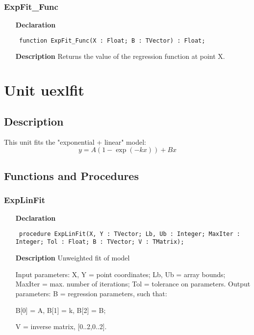 \documentclass[12pt,a4paper,oneside]{report}
\newcommand{\declarationitem}[1]{\textbf{#1}}
\newcommand{\descriptiontitle}[1]{\textbf{#1}}
\newcommand{\code}[1]{\texttt{#1}}
\begin{document}
\subsubsection{ExpFit{\_}Func}
\label{uexpfit-ExpFit_Func}
\begin{itemize}\item[\declarationitem{Declaration}\hfill]
	\begin{flushleft}
		\code{
			function ExpFit{\_}Func(X : Float; B : TVector) : Float;}
		
	\end{flushleft}
	
	\par
	\item[\descriptiontitle{Description}]
	Returns the value of the regression function at point X.
	
\end{itemize}

\section{Unit uexlfit}
\label{uexlfit}
\subsection{Description}
This unit fits the "exponential + linear" model:
$$y = A (1 - \exp(-k x)) + B x$$
\subsection{Functions and Procedures}
\subsubsection{ExpLinFit}
\label{uexlfit-ExpLinFit}
\begin{itemize}\item[\declarationitem{Declaration}\hfill]
	\begin{flushleft}
		\code{
			procedure ExpLinFit(X, Y : TVector; Lb, Ub : Integer; MaxIter : Integer; Tol : Float; B : TVector; V : TMatrix);}
		
	\end{flushleft}
	
	\par
	\item[\descriptiontitle{Description}]
	Unweighted fit of model
	
	Input parameters: X, Y = point coordinates; Lb, Ub = array bounds; MaxIter = max. number of iterations; Tol = tolerance on parameters. Output parameters: B = regression parameters, such that:
	
	B[0] = A, B[1] = k, B[2] = B; 
	
	V = inverse matrix, [0..2,0..2].
	
\end{itemize}
\end{document}
